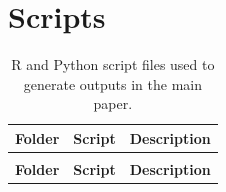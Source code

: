 \documentclass[
  11pt,
  a4paper,
]{report}
\begin{document}
\section{Scripts}\label{scripts}

\begingroup\fontsize{12}{14}\selectfont

\begin{longtable}{>{\raggedright\arraybackslash}p{3.5cm}>{\raggedright\arraybackslash}p{6.5cm}>{\raggedright\arraybackslash}p{3cm}}

\caption{\label{tbl-script-desc}R and Python script files used to
generate outputs in the main paper.}

\tabularnewline

\toprule
\textbf{Folder} & \textbf{Script} & \textbf{Description}\\
\midrule
\endfirsthead
\multicolumn{3}{@{}l}{\textit{(continued)}}\\
\toprule
\textbf{Folder} & \textbf{Script} & \textbf{Description}\\
\midrule
\endhead


\end{longtable}
\end{document}
